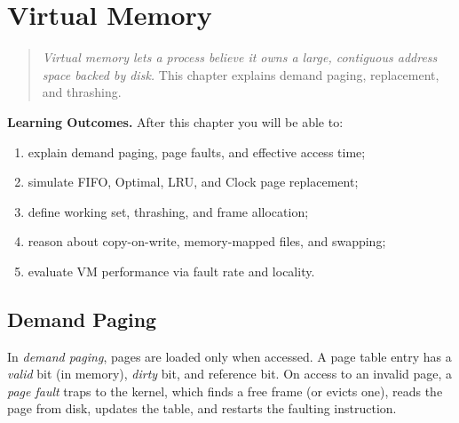 \chapter{Virtual Memory}
\label{ch:vmem}

\begin{quote}
\emph{Virtual memory lets a process believe it owns a large, contiguous
address space backed by disk.} This chapter explains demand paging, replacement,
and thrashing.
\end{quote}

\noindent\textbf{Learning Outcomes.} After this chapter you will be able to:
\begin{enumerate}[label=(L\arabic*)]
  \item explain demand paging, page faults, and effective access time;
  \item simulate FIFO, Optimal, LRU, and Clock page replacement;
  \item define working set, thrashing, and frame allocation;
  \item reason about copy-on-write, memory-mapped files, and swapping;
  \item evaluate VM performance via fault rate and locality.
\end{enumerate}

\section{Demand Paging}
\label{sec:demand-paging}

In \emph{demand paging}, pages are loaded only when accessed. A page table
entry has a \emph{valid} bit (in memory), \emph{dirty} bit, and reference bit.
On access to an invalid page, a \emph{page fault} traps to the kernel, which
finds a free frame (or evicts one), reads the page from disk, updates the
table, and restarts the faulting instruction.

